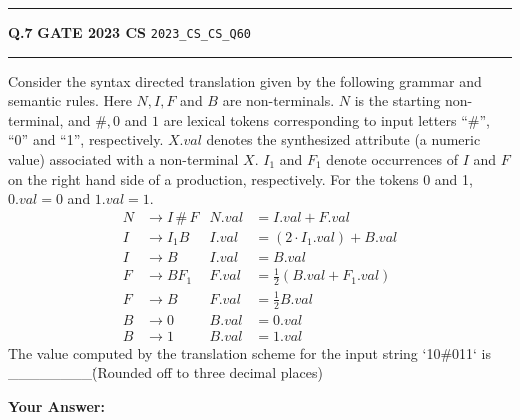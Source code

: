 \documentclass[a4paper,10pt]{article}
\begin{document}
\vspace{6pt}\hrule height 0.35pt\vspace{6pt}
\noindent
\begin{tcolorbox}[
    blanker,
    sidebyside,
    sidebyside align=top,
    lefthand width=0.55\textwidth,
    top=4pt, bottom=4pt, left=0pt, right=0pt,
    middle=16pt,
    underlay={
        \draw[dashed, black!80, line width=0.8pt, dash pattern=on 4pt off 3pt]
            ([xshift=0.55\textwidth+8pt]frame.north west) --
            ([xshift=0.55\textwidth+8pt]frame.south west);
    }
]
\textbf{Q.7}  \hfill {\footnotesize\textbf{GATE 2023 CS} \quad \tiny\texttt{2023\_CS\_CS\_Q60}}
\vspace{2pt}\hrule height 0.3pt\vspace{4pt}

Consider the syntax directed translation given by the following grammar and semantic rules. Here $N, I, F$ and $B$ are non-terminals. $N$ is the starting non-terminal, and $\#, 0$ and $1$ are lexical tokens corresponding to input letters ``\#'', ``0'' and ``1'', respectively. $X.val$ denotes the synthesized attribute (a numeric value) associated with a non-terminal $X$. $I_1$ and $F_1$ denote occurrences of $I$ and $F$ on the right hand side of a production, respectively. For the tokens 0 and 1, $0.val = 0$ and $1.val = 1$.
\begin{align*}
N &\to I \,\#\, F & N.val &= I.val + F.val \\
I &\to I_1 B & I.val &= (2 \cdot I_1.val) + B.val \\
I &\to B & I.val &= B.val \\
F &\to B F_1 & F.val &= \frac{1}{2}(B.val + F_1.val) \\
F &\to B & F.val &= \frac{1}{2}B.val \\
B &\to 0 & B.val &= 0.val \\
B &\to 1 & B.val &= 1.val
\end{align*}
The value computed by the translation scheme for the input string `10\#011` is \_\_\_\_\_\_\_\_\. (Rounded off to three decimal places)

\par\vspace{6pt}\noindent\textbf{Your Answer:} \fbox{\rule{0pt}{1.3ex}\hspace{3cm}}

\tcblower


\end{tcolorbox}
\end{document}
